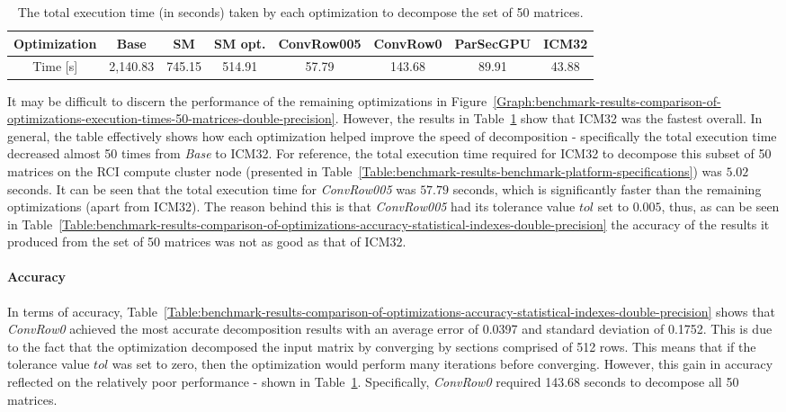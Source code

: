 \begin{table}[ht!]
	\centering
	\renewcommand{\arraystretch}{1.5}
	\begin{tabular}{ |c|c|c|c|c|c|c|c| } 
		\hline
		Optimization & Base    & SM     & SM opt. & ConvRow005 & ConvRow0 & ParSecGPU & ICM32 \\
		\hline
		Time [s]     & 2,140.83 & 745.15 & 514.91  & 57.79      & 143.68   &  89.91    & 43.88 \\
		\hline
	\end{tabular}
	\caption{The total execution time (in seconds) taken by each optimization to decompose the set of 50 matrices.}
	\label{Table:benchmark-results-comparison-of-optimizations-total-execution-time}
\end{table}

It may be difficult to discern the performance of the remaining optimizations in Figure~\ref{Graph:benchmark-results-comparison-of-optimizations-execution-times-50-matrices-double-precision}. However, the results in Table~\ref{Table:benchmark-results-comparison-of-optimizations-total-execution-time} show that ICM32 was the fastest overall. In general, the table effectively shows how each optimization helped improve the speed of decomposition - specifically the total execution time decreased almost 50 times from \textit{Base} to ICM32. For reference, the total execution time required for ICM32 to decompose this subset of 50 matrices on the RCI compute cluster node (presented in Table~\ref{Table:benchmark-results-benchmark-platform-specifications}) was $ 5.02 $ seconds.
It can be seen that the total execution time for \textit{ConvRow005} was $ 57.79 $ seconds, which is significantly faster than the remaining optimizations (apart from ICM32). The reason behind this is that \textit{ConvRow005} had its tolerance value $ tol $ set to $ 0.005 $, thus, as can be seen in Table~\ref{Table:benchmark-results-comparison-of-optimizations-accuracy-statistical-indexes-double-precision} the accuracy of the results it produced from the set of 50 matrices was not as good as that of ICM32.

\paragraph{Accuracy} In terms of accuracy, Table~\ref{Table:benchmark-results-comparison-of-optimizations-accuracy-statistical-indexes-double-precision} shows that \textit{ConvRow0} achieved the most accurate decomposition results with an average error of 0.0397 and standard deviation of 0.1752. This is due to the fact that the optimization decomposed the input matrix by converging by sections comprised of 512 rows. This means that if the tolerance value $ tol $ was set to zero, then the optimization would perform many iterations before converging. However, this gain in accuracy reflected on the relatively poor performance - shown in Table~\ref{Table:benchmark-results-comparison-of-optimizations-total-execution-time}. Specifically, \textit{ConvRow0} required 143.68 seconds to decompose all 50 matrices.

